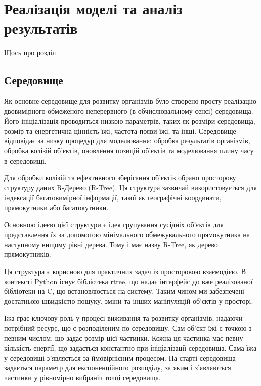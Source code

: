 \chapter{Реалізація моделі та аналіз результатів}
\label{chap:practice}

Щось про розділ




\section{Середовище}

Як основне середовище для розвитку організмів було створено просту реалізацію двовимірного обмеженого неперервного (в обчислювальному сенсі) середовища. Його ініціалізація проводиться низкою параметрів, таких як розміри середовища, розмір та енергетична цінність їжі, частота появи їжі, та інші. Середовище відповідає за низку процедур для моделювання: обробка результатів організмів, обробка колізій об’єктів, оновлення позицій об’єктів та моделювання плину часу в середовищі.

Для обробки колізій та ефективного зберігання об’єктів обрано просторову структуру даних R-Дерево (R-Tree). Ця структура зазвичай використовується для індексації багатовимірної інформації, такої як географічні координати, прямокутники або багатокутники.

Основною ідеєю цієї структури є ідея групування сусідніх об’єктів для представлення їх за допомогою мінімального обмежувального прямокутника на наступному вищому рівні дерева. Тому і має назву R-Tree, як дерево прямокутників.

Ця структура є корисною для практичних задач із просторовою взаємодією. В контексті Python існує бібліотека rtree, що надає інтерфейс до вже реалізованої бібліотеки на C, що встановлюється на систему. Таким чином ми забезпечені достатньою швидкістю пошуку, зміни та інших маніпуляцій об’єктів у просторі.

Їжа грає ключову роль у процесі виживання та розвитку організмів, надаючи потрібний ресурс, що є розподіленим по середовищу. Сам об’єкт їжі є точкою з певним числом, що задає розмір цієї частинки. Кожна ця частинка має певну кількість енергії, що задається константно при ініціалізації середовища. Сама їжа у середовищі з’являється за ймовірнісним процесом. На старті середовища задається параметр для експоненційного розподілу, за яким і з’являються частинки у рівномірно вибраніч точці середовища.

